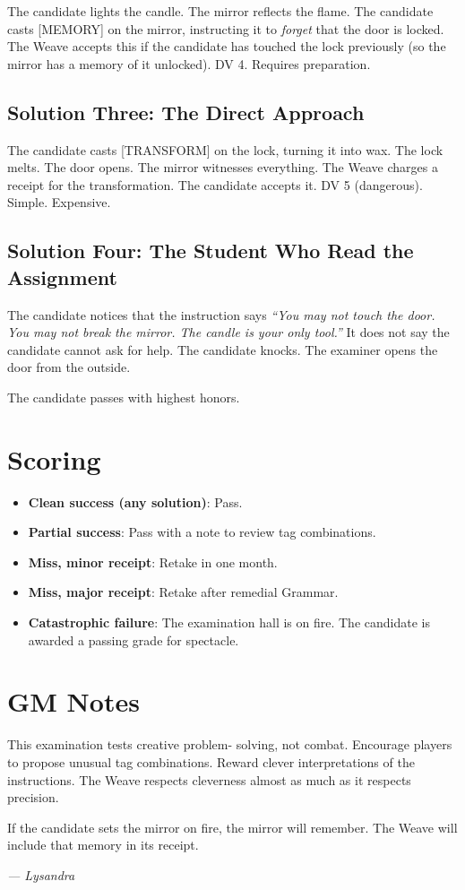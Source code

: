The candidate lights the candle. The mirror reflects the flame. The candidate casts [MEMORY] on the mirror, instructing it to \emph{forget} that the door is locked. The Weave accepts this if the candidate has touched the lock previously (so the mirror has a memory of it unlocked). DV 4. Requires preparation.

\subsection{Solution Three: The Direct Approach}

The candidate casts [TRANSFORM] on the lock, turning it into wax. The lock melts. The door opens. The mirror witnesses everything. The Weave charges a receipt for the transformation. The candidate accepts it. DV 5 (dangerous). Simple. Expensive.

\subsection{Solution Four: The Student Who Read the Assignment}

The candidate notices that the instruction says \emph{``You may not touch the door. You may not break the mirror. The candle is your only tool.''} It does not say the candidate cannot ask for help. The candidate knocks. The examiner opens the door from the outside.

The candidate passes with highest honors.

\section{Scoring}

\begin{itemize}
    \item \textbf{Clean success (any solution)}: Pass.
    \item \textbf{Partial success}: Pass with a note to review tag combinations.
    \item \textbf{Miss, minor receipt}: Retake in one month.
    \item \textbf{Miss, major receipt}: Retake after remedial Grammar.
    \item \textbf{Catastrophic failure}: The examination hall is on fire. The candidate is awarded a passing grade for spectacle.
\end{itemize}

\section{GM Notes}

This examination tests creative problem- solving, not combat. Encourage players to propose unusual tag combinations. Reward clever interpretations of the instructions. The Weave respects cleverness almost as much as it respects precision.

If the candidate sets the mirror on fire, the mirror will remember. The Weave will include that memory in its receipt.

\textit{--- Lysandra}
